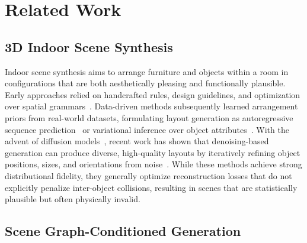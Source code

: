 \section{Related Work}
\label{sec:related}

\subsection{3D Indoor Scene Synthesis}
\label{sec:related:scene_synth}

Indoor scene synthesis aims to arrange furniture and objects within a room in configurations that are both aesthetically pleasing and functionally plausible.
Early approaches relied on handcrafted rules, design guidelines, and optimization over spatial grammars~\cite{placeholder_grammars, placeholder_yeh2012, placeholder_fisher2012}.
Data-driven methods subsequently learned arrangement priors from real-world datasets, formulating layout generation as autoregressive sequence prediction~\cite{placeholder_autoreg_ritchie, placeholder_sceneformer, placeholder_atiss} or variational inference over object attributes~\cite{placeholder_fastsynth, placeholder_planit}.
With the advent of diffusion models~\cite{placeholder_ddpm_ho, placeholder_song_score}, recent work has shown that denoising-based generation can produce diverse, high-quality layouts by iteratively refining object positions, sizes, and orientations from noise~\cite{placeholder_diffuscene, placeholder_layoutdiffusion}.
While these methods achieve strong distributional fidelity, they generally optimize reconstruction losses that do not explicitly penalize inter-object collisions, resulting in scenes that are statistically plausible but often physically invalid.

\subsection{Scene Graph-Conditioned Generation}
\label{sec:related:sg_gen}

